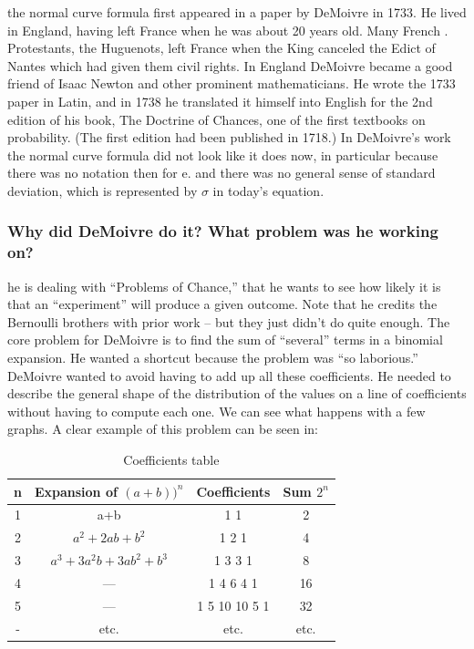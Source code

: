 \documentclass{article}
\begin{document}
the normal curve formula first appeared in a paper by DeMoivre in 1733. He lived in
England, having left France when he was about 20 years old. Many French .
Protestants, the Huguenots, left France when the King canceled the Edict of Nantes
which had given them civil rights. In England DeMoivre became a good friend of
Isaac Newton and other prominent mathematicians.
He wrote the 1733 paper in Latin, and in 1738 he translated it himself into English for
the 2nd edition of his book, The Doctrine of Chances, one of the first textbooks on
probability. (The first edition had been published in 1718.)
In DeMoivre’s work the normal curve formula did not look like it does now, in particular because there
was no notation then for e. and there was no general sense of standard deviation, which is represented by $ \sigma $ in today’s equation.
\subsubsection{Why did DeMoivre do it? What problem was he working on?}

he is dealing with
“Problems of Chance,” that he wants
to see how likely it is that an
“experiment” will produce a given
outcome. Note that he credits the
Bernoulli brothers with prior work –
but they just didn’t do quite enough.
The core problem for DeMoivre is to
find the sum of “several” terms in a
binomial expansion. He wanted a
shortcut because the problem was “so
laborious.”
DeMoivre wanted to avoid having to add up all these coefficients. He needed to describe the general
shape of the distribution of the values on a line of coefficients without having to compute each one. We can see what happens with a few graphs.
A clear example of this problem can be seen in:
\begin{table}[H]
\centering
\begin{tabular}{c|c|c|c}
    n &  Expansion of $ (a+b))^n $ & Coefficients & Sum $ 2^{n} $ \\\hline

    1 &  a+b& 1 1 & 2                                \\
    2 & $ a^2 +2ab+b^2 $ & 1 2 1 & 4                     \\
    3 & $ a^3+3a^{2}b+3ab^2+b^3 $ & 1 3 3 1 & 8                \\
    4 & ---   & 1 4 6 4 1 & 16                         \\
    5 & ---   & 1 5 10 10 5 1 & 32                     \\
    - & etc. & etc. & etc.                         \\

\end{tabular}
\caption{\label{tab:widgets}Coefficients table}
\end{table}
\end{document}
